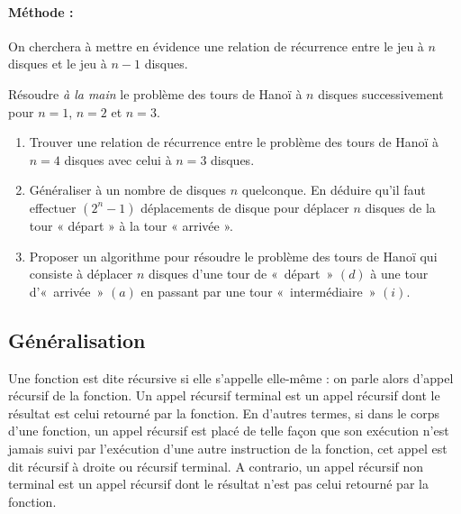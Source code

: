 \paragraph{Méthode :} On cherchera à mettre en évidence une relation de récurrence
entre le jeu à $n$ disques et le jeu à $n-1$ disques.



\begin{question}
Résoudre {\em à la main} le problème des tours de Hanoï à $n$ disques
successivement pour $n=1$, $n=2$ et $n=3$.
\end{question}

\begin{question}\mbox{}
\begin{enumerate}
\item Trouver une relation de récurrence entre le problème des tours de Hanoï à $n=4$ disques
	avec celui à $n=3$ disques.
\item Généraliser à un nombre de disques $n$ quelconque.
	En déduire qu'il faut effectuer $(2^n - 1)$ déplacements de disque pour déplacer $n$
	disques de la tour « départ » à la tour « arrivée ».
\item Proposer un algorithme pour résoudre le problème des tours de Hanoï 
	qui consiste à déplacer $n$ disques d'une tour de «~départ~» $(d)$ à une 
	tour d'«~arrivée~» $(a)$ en passant par une tour «~intermédiaire~» $(i)$.
\end{enumerate}
\end{question}

\subsection{Généralisation}
Une fonction est dite récursive si elle s'appelle elle-même : on parle 
alors d'appel récursif de la fonction.
Un appel récursif terminal est un appel récursif dont le résultat est celui 
retourné par la fonction. En d'autres termes, si dans le corps d'une fonction, 
un appel récursif est placé de telle façon que son exécution n'est jamais suivi 
par l'exécution d'une autre instruction de la fonction, cet appel est dit récursif
à droite ou récursif terminal.
A contrario, un appel récursif non terminal est 
un appel récursif dont le résultat n'est pas celui retourné par la fonction.


